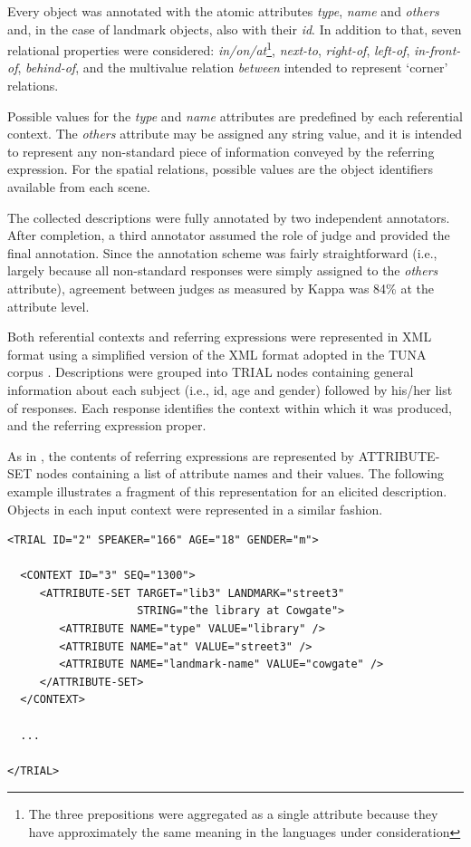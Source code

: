 \documentclass{article}
\begin{document}
Every object was annotated with the atomic attributes {\em type}, {\em name} and {\em others} and, in the case of landmark objects, also with their {\em id}. In addition to that, seven relational properties were considered: {\em in/on/at}\footnote{The three prepositions were aggregated as a single attribute because they have approximately the same meaning in the languages under consideration}, {\em next-to}, {\em right-of}, {\em left-of}, {\em in-front-of}, {\em behind-of}, and the multivalue relation {\em between} intended to represent `corner' relations. 

Possible values for the {\em type} and {\em name} attributes are predefined by each referential context. The {\em others} attribute may be assigned any string value, and it is intended to represent any non-standard piece of information conveyed by the referring expression. For the spatial relations, possible values are the object identifiers available from each scene.

The collected descriptions were fully annotated by two independent annotators. After completion, a third annotator assumed the role of judge and provided the final annotation. Since the annotation scheme was fairly straightforward (i.e., largely because all non-standard responses were simply assigned to the {\em others} attribute), agreement between judges as measured by Kappa \cite{kappa} was 84\% at the attribute level. 

Both referential contexts and referring expressions were represented in XML format using a simplified version of the XML format adopted in the TUNA corpus \cite{tuna-corpus}. Descriptions were grouped into TRIAL nodes containing general information about each subject (i.e., id, age and gender) followed by his/her list of responses. Each response identifies the context within which it was produced, and the referring expression proper. 

As in \cite{tuna-corpus}, the contents of referring expressions are represented by ATTRIBUTE-SET nodes containing a list of attribute names and their values. The following example illustrates a fragment of this representation for an elicited description. Objects in each input context were represented in a similar fashion.

\tiny{
\begin{verbatim}
<TRIAL ID="2" SPEAKER="166" AGE="18" GENDER="m">

  <CONTEXT ID="3" SEQ="1300">
     <ATTRIBUTE-SET TARGET="lib3" LANDMARK="street3" 
                    STRING="the library at Cowgate">
        <ATTRIBUTE NAME="type" VALUE="library" />
        <ATTRIBUTE NAME="at" VALUE="street3" />
        <ATTRIBUTE NAME="landmark-name" VALUE="cowgate" />
     </ATTRIBUTE-SET>
  </CONTEXT>

  ...
	
</TRIAL>	
\end{verbatim}
}
\normalsize
\end{document}
